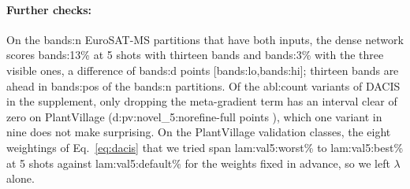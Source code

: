 \paragraph{Further checks:}
On the \num{bands:n} EuroSAT-MS partitions that have both inputs, the dense network scores \num{bands:13}\% at 5 shots with thirteen bands and \num{bands:3}\% with the three visible ones, a difference of \num{bands:d} points [\num{bands:lo},\num{bands:hi}]; thirteen bands are ahead in \num{bands:pos} of the \num{bands:n} partitions. Of the \num{abl:count} variants of DACIS in the supplement, only dropping the meta-gradient term has an interval clear of zero on PlantVillage (\num{d:pv:novel_5:norefine-full} points ), which one variant in nine does not make surprising. \label{sec:lambda}On the PlantVillage validation classes, the eight weightings of Eq.~\eqref{eq:dacis} that we tried span \num{lam:val5:worst}\% to \num{lam:val5:best}\% at 5 shots against \num{lam:val5:default}\% for the weights fixed in advance, so we left $\lambda$ alone.